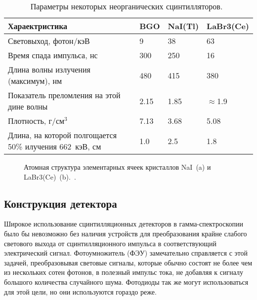 \begin{table} [htbp]
    \centering
    \begin{threeparttable}
      \caption{ Параметры некоторых неорганических сцинтилляторов.~\cite{Grozdanov2021} }
        \label{tab:scintiilatorProperties}
        \begin{tabular}{| p{7cm} | p{2cm} | p{2cm} | p{2cm} | }
            \hline
            Хараектристика   & BGO & NaI(Tl) & LaBr3(Ce) \\
            \hline
            Световыход, фотон/кэВ & 9 & 38 & 63 \\
            Время спада импульса, нс & 300 & 250 & 16 \\
            Длина волны излучения (максимум), нм & 480 & 415 & 380 \\
            Показатель преломления на этой дине волны & 2.15 & 1.85 & $\approx$1.9 \\
            Плотность, г/см${}^3$ & 7.13 & 3.68 & 5.08 \\
            Длина, на которой полгощается 50\% илучения 662~кэВ, см & 1.0 & 2.5 & 1.8 \\
            \hline
        \end{tabular}
    \end{threeparttable}
\end{table}

\begin{figure}[ht]
  \caption{ Атомная структура элементарных ячеек кристаллов NaI~(a) и LaBr3(Ce)~(b).~\cite{Schleife2016}.}
  \label{fig:scintillatorAtomicStructure}
\end{figure}




\subsection{Конструкция детектора}

Широкое использование сцинтилляционных детекторов в гамма-спектроскопии было бы невозможно без наличия устройств для преобразования крайне слабого светового выхода от сцинтилляционного импульса в соответствующий электрический сигнал. Фотоумножитель (ФЭУ) замечательно справляется с этой задачей, преобразовывая световые сигналы, которые обычно состоят не более чем из нескольких сотен фотонов, в полезный импульс тока, не добавляя к сигналу большого количества случайного шума. Фотодиоды так же могут использоваться для этой цели, но они используются гораздо реже.~\cite{Knoll2010}


